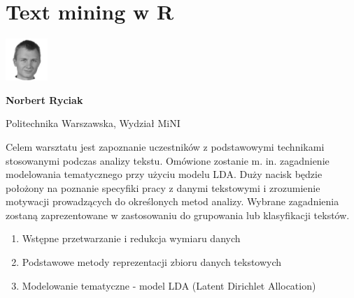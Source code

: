 \documentclass[\main/boa.tex]{subfiles}
\begin{document}
\section{Text mining w R}
\begin{minipage}[t]{0.915\textwidth}
	\center     
    \includegraphics[width=60px]{img/workshops/czarno_biale/ryciak-crop.png} 
\end{minipage}

\begin{minipage}{0.915\textwidth}
\centering
{\bf {} Norbert Ryciak}
\end{minipage}

\vskip 0.3cm

\begin{affiliations}
\begin{minipage}{0.915\textwidth}
\centering
\large Politechnika Warszawska, Wydział MiNI  \\[2pt]
\end{minipage}
\end{affiliations}

\vskip 0.8cm

\opiswarsztatu Celem warsztatu jest zapoznanie uczestników z podstawowymi technikami stosowanymi podczas analizy tekstu. Omówione zostanie m. in. zagadnienie modelowania tematycznego przy użyciu modelu LDA. Duży nacisk będzie położony na poznanie specyfiki pracy z danymi tekstowymi i zrozumienie motywacji prowadzących do określonych metod analizy. Wybrane zagadnienia zostaną zaprezentowane w zastosowaniu do grupowania lub klasyfikacji tekstów.

\planwarsztatu
\begin{enumerate}
\item Wstępne przetwarzanie i redukcja wymiaru danych
\item Podstawowe metody reprezentacji zbioru danych tekstowych
\item Modelowanie tematyczne - model LDA (Latent Dirichlet Allocation)
\end{enumerate}	 
\end{document}
